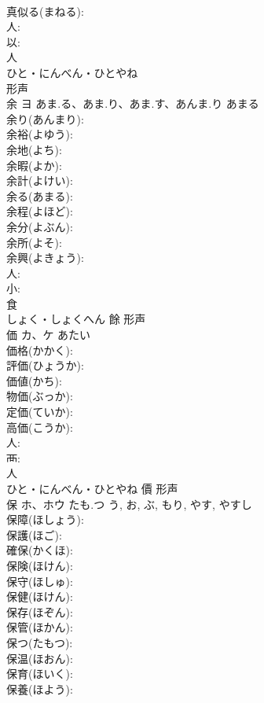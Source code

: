 \documentclass[8pt]{extreport}
\begin{document}
\begin{CJK}{UTF8}{min}
\\	真似る(まねる): 
\\	人: 
\\	以: 
\\	人	
\\	ひと・にんべん・ひとやね	
\\	形声 
\\	余	ヨ	あま.る、あま.り、あま.す、あんま.り	あまる	
\\	余り(あんまり): 
\\	余裕(よゆう): 
\\	余地(よち): 
\\	余暇(よか): 
\\	余計(よけい): 
\\	余る(あまる): 
\\	余程(よほど): 
\\	余分(よぶん): 
\\	余所(よそ): 
\\	余興(よきょう): 
\\	人: 
\\	小: 
\\	食	
\\	しょく・しょくへん	餘	形声 
\\	価	カ、ケ	あたい		
\\	価格(かかく): 
\\	評価(ひょうか): 
\\	価値(かち): 
\\	物価(ぶっか): 
\\	定価(ていか): 
\\	高価(こうか): 
\\	人: 
\\	襾: 
\\	人	
\\	ひと・にんべん・ひとやね	價	形声 
\\	保	ホ、ホウ	たも.つ	う, お, ぶ, もり, やす, やすし	
\\	保障(ほしょう): 
\\	保護(ほご): 
\\	確保(かくほ): 
\\	保険(ほけん): 
\\	保守(ほしゅ): 
\\	保健(ほけん): 
\\	保存(ほぞん): 
\\	保管(ほかん): 
\\	保つ(たもつ): 
\\	保温(ほおん): 
\\	保育(ほいく): 
\\	保養(ほよう): 

\end{CJK}
\end{document}
